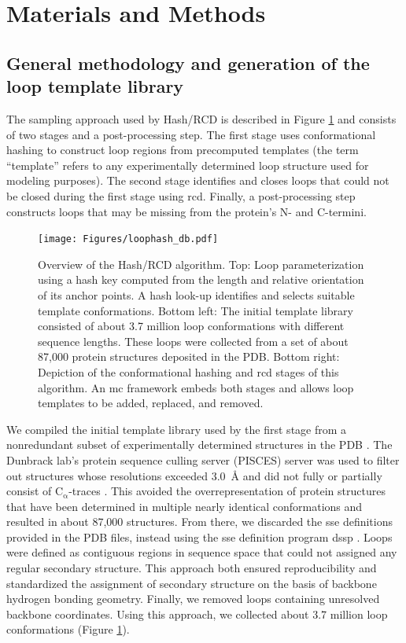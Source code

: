 \section{Materials and Methods}\label{sec:loophash_methods}

\subsection{General methodology and generation of the loop template library}

The sampling approach used by Hash/RCD is described in Figure \ref{fig:loophash_db} and consists of two stages and a post-processing step. The first stage uses conformational hashing to construct loop regions from precomputed templates (the term “template” refers to any experimentally determined loop structure used for modeling purposes). The second stage identifies and closes loops that could not be closed during the first stage using \gls{rcd}. Finally, a post-processing step constructs loops that may be missing from the protein's N- and C-termini.

\begin{figure}[h]
\centering
\texttt{[image: Figures/loophash\_db.pdf]}
 \caption[Overview of the Hash/RCD algorithm.]{Overview of the Hash/RCD algorithm. Top: Loop parameterization using a hash key computed from the length and relative orientation of its anchor points. A hash look-up identifies and selects suitable template conformations. Bottom left: The initial template library consisted of about 3.7 million loop conformations with different sequence lengths. These loops were collected from a set of about 87,000 protein structures deposited in the PDB. Bottom right: Depiction of the conformational hashing and \gls{rcd} stages of this algorithm. An \gls{mc} framework embeds both stages and allows loop templates to be added, replaced, and removed.}
\label{fig:loophash_db}
\end{figure}

We compiled the initial template library used by the first stage from a nonredundant subset of experimentally determined structures in the PDB \citep*{Bernstein1978}. The Dunbrack lab’s protein sequence culling server (PISCES) server was used to filter out structures whose resolutions exceeded \SI{3.0}{\angstrom} and did not fully or partially consist of $\mathrm{C_{\upalpha}}$-traces \citep*{Wang2003, Wang2005}. This avoided the overrepresentation of protein structures that have been determined in multiple nearly identical conformations and resulted in about 87,000 structures. From there, we discarded the \gls{sse} definitions provided in the PDB files, instead using the \gls{sse} definition program \gls{dssp} \citep*{Kabsch1983}. Loops were defined as contiguous regions in sequence space that could not assigned any regular secondary structure. This approach both ensured reproducibility and standardized the assignment of secondary structure on the basis of backbone hydrogen bonding geometry. Finally, we removed loops containing unresolved backbone coordinates. Using this approach, we collected about 3.7 million loop conformations (Figure \ref{fig:loophash_db}).

